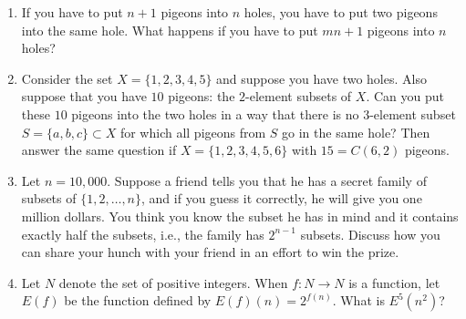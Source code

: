 \begin{enumerate}
\begin{enumerate}
\end{enumerate}

\item If you have to put $n+1$ pigeons into $n$ holes, you have to
put two pigeons into the same hole.  What happens if you have to
put $mn+1$ pigeons into $n$ holes?

\item Consider the set $X=\{1,2,3,4,5\}$ and suppose you have two holes.
Also suppose that you have $10$ pigeons: the $2$-element subsets of
$X$.  Can you put these $10$ pigeons into the two holes in a way that there
is no $3$-element subset $S=\{a,b,c\}\subset X$ for which all pigeons from
$S$ go in the same hole?  Then answer the same question if $X=\{1,2,3,4,5,6\}$
with $15 = C(6,2)$ pigeons.

\item  Let $n=10,000$. Suppose a friend tells you that he has a secret family of subsets
of $\{1,2,\dots,n\}$, and if you guess it correctly, he will give you one million
dollars.  You think you know the subset he has in mind and it contains exactly
half the subsets, i.e., the family has $2^{n-1}$ subsets.  Discuss how you can
share your hunch with your friend in an effort to win the prize.   

\item  Let $N$ denote the set of positive integers.  When $f:N\rightarrow N$ is
a function, let $E(f)$ be the function defined by $E(f)(n) = 2^{f(n)}$.
What is $E^5(n^2)$?

\end{enumerate}
